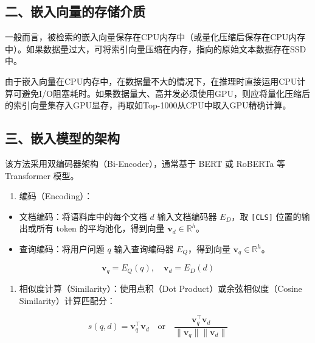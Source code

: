\hypertarget{ux4e8cux5d4cux5165ux5411ux91cfux7684ux5b58ux50a8ux4ecbux8d28}{%
\subsection{二、嵌入向量的存储介质}\label{ux4e8cux5d4cux5165ux5411ux91cfux7684ux5b58ux50a8ux4ecbux8d28}}

一般而言，被检索的嵌入向量保存在CPU内存中（或量化压缩后保存在CPU内存中）。如果数据量过大，可将索引向量压缩在内存，指向的原始文本数据存在SSD中。

由于嵌入向量在CPU内存中，在数据量不大的情况下，在推理时直接运用CPU计算可避免I/O阻塞耗时。如果数据量大、高并发必须使用GPU，则应将量化压缩后的索引向量集存入GPU显存，再取如Top-1000从CPU中取入GPU精确计算。

\hypertarget{ux4e09ux5d4cux5165ux6a21ux578bux7684ux67b6ux6784}{%
\subsection{三、嵌入模型的架构}\label{ux4e09ux5d4cux5165ux6a21ux578bux7684ux67b6ux6784}}

该方法采用双编码器架构（Bi-Encoder），通常基于 BERT 或 RoBERTa 等 Transformer 模型。

\begin{enumerate}
\def\labelenumi{\arabic{enumi}.}
\tightlist
\item
  编码（Encoding）：
\end{enumerate}

\begin{itemize}
\tightlist
\item
  文档编码：将语料库中的每个文档 \(d\) 输入文档编码器 \(E_D\)，取 \texttt{{[}CLS{]}} 位置的输出或所有 token 的平均池化，得到向量 \(\mathbf{v}_d \in \mathbb{R}^h\)。
\item
  查询编码：将用户问题 \(q\) 输入查询编码器 \(E_Q\)，得到向量 \(\mathbf{v}_q \in \mathbb{R}^h\)。
\end{itemize}

\[
\mathbf{v}_q=E_Q(q),\quad \mathbf{v}_d=E_D(d)
\]

\begin{enumerate}
\def\labelenumi{\arabic{enumi}.}
\setcounter{enumi}{1}
\tightlist
\item
  相似度计算（Similarity）：使用点积（Dot Product）或余弦相似度（Cosine Similarity）计算匹配分：
\end{enumerate}

\[
s(q,d)=\mathbf{v}_q^\top\mathbf{v}_d\quad \mathrm{or}\quad \frac{\mathbf{v}_q^\top\mathbf{v}_d}{\lVert\mathbf{v}_q\rVert\lVert\mathbf{v}_d\rVert}
\]

